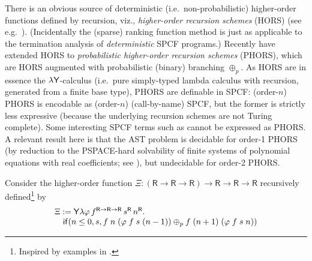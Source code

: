 There is an obvious source of deterministic (i.e.~non-probabilistic) higher-order functions defined by recursion, viz., \emph{higher-order recursion schemes} (HORS) (see e.g.~\citep{DBLP:conf/lics/Ong06,DBLP:conf/lics/Ong15}).
(Incidentally the (sparse) ranking function method is just as applicable to the termination analysis of \emph{deterministic} SPCF programs.)
Recently \cite{DBLP:conf/lics/KobayashiLG19} have extended HORS to \emph{probabilistic higher-order recursion schemes} (PHORS), which are HORS augmented with probabilistic (binary) branching $\oplus_p$.
As HORS are in essence the $\lambda \mathsf{Y}$-calculus \citep{DBLP:conf/lics/Statman02} (i.e.~pure simply-typed lambda calculus with recursion, generated from a finite base type), PHORS are definable in SPCF:
(order-$n$) PHORS is encodable as (order-$n$) (call-by-name) SPCF, but the former is strictly less expressive (because the underlying recursion schemes are not Turing complete). 
Some interesting SPCF terms such as  %
cannot be expressed as PHORS.
A relevant result here is that the AST problem is decidable for order-1 PHORS (by reduction to the PSPACE-hard solvability of finite systems of polynomial equations with real coefficients; see \citep{DBLP:journals/jacm/EtessamiY09}), but undecidable for order-2 PHORS.

\begin{example}
Consider the higher-order function
$\Xi : (\textsf{R} \to \textsf{R} \to \textsf{R}) \to \textsf{R} \to \textsf{R} \to \textsf{R}$
recursively defined\footnote{Inspired by examples in \citep{DBLP:journals/pacmpl/BurnOR18,DBLP:conf/lics/OngW19}.} by
\[
\begin{array}{l}
\Xi := \mathsf{Y} \lambda \varphi \, f^{\textsf{R} \to \textsf{R} \to \textsf{R}} \, s^\textsf{R} \, n^\textsf{R} . \\
\quad\mathsf{if}(n \leq 0, s, 
f \; n \; (\varphi \; f \; s \; (n - 1))
\oplus_p
f \; (n+1) \; (\varphi \; f \; s \; n)
)
\end{array}
\]
\end{example}
